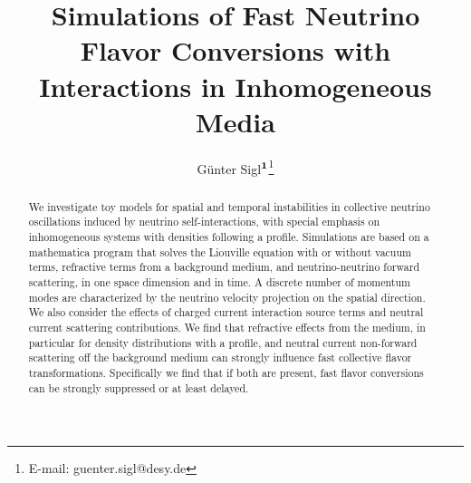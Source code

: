 \documentclass[prd,aps]{revtex4-2}
\begin{document}
\title{Simulations of Fast Neutrino Flavor Conversions with Interactions in Inhomogeneous Media}

\author{G\"unter Sigl$^{\it \bf 1}$\footnote[1]{E-mail: guenter.sigl@desy.de}}


\begin{abstract}
We investigate toy models for spatial and temporal instabilities in collective neutrino oscillations induced by
neutrino self-interactions, with special emphasis on inhomogeneous systems with densities following a profile. 
Simulations are based on a mathematica program that solves the Liouville equation with or without vacuum terms, 
refractive terms from a background medium,
and neutrino-neutrino forward scattering, in one space dimension and in time. A discrete number of momentum 
modes are characterized by the neutrino velocity projection on the spatial direction. We also consider the effects of 
charged current interaction source terms and neutral current scattering contributions. We find that refractive effects 
from the medium, in particular for density distributions with a profile, and neutral current non-forward scattering
off the background medium can strongly influence fast collective flavor transformations. Specifically we find that
if both are present, fast flavor conversions can be strongly suppressed or at least delayed.
\end{abstract}


\maketitle
\end{document}
